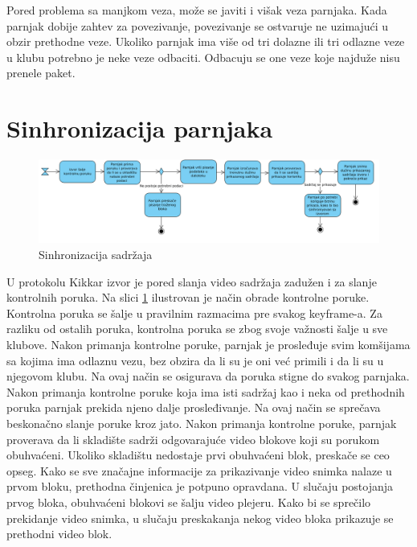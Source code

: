 \documentclass[12pt,oneside]{memoir}
\begin{document}
Pored problema sa manjkom veza, može se javiti i višak veza parnjaka. Kada parnjak dobije zahtev za povezivanje, povezivanje se ostvaruje ne uzimajući u obzir prethodne veze. Ukoliko parnjak ima više od tri dolazne ili tri odlazne veze u klubu potrebno je neke veze odbaciti. Odbacuju se one veze koje najduže nisu prenele paket. 
  

\section{Sinhronizacija parnjaka}
\label{Kikkar.5}

\begin{figure}[!ht]
  \centering
  \includegraphics[width=1.05\textwidth]{slike/sinhronizacija.jpg}
  \caption{Sinhronizacija sadržaja}
  \label{fig:sinhronizacija}
\end{figure}
\par

U protokolu Kikkar izvor je pored slanja video sadržaja zadužen i za slanje kontrolnih poruka. Na slici \ref{Kikkar.5} ilustrovan je način obrade kontrolne poruke. Kontrolna poruka se šalje u pravilnim razmacima pre svakog keyframe-a. Za razliku od ostalih poruka, kontrolna poruka se zbog svoje važnosti šalje u sve klubove. Nakon primanja kontrolne poruke, parnjak je prosleđuje svim komšijama sa kojima ima odlaznu vezu, bez obzira da li su je oni već primili i da li su u njegovom klubu. Na ovaj način se osigurava da poruka stigne do svakog parnjaka. Nakon primanja kontrolne poruke koja ima isti sadržaj kao i neka od prethodnih poruka parnjak prekida njeno dalje prosleđivanje. Na ovaj način se sprečava beskonačno slanje poruke kroz jato. Nakon primanja kontrolne poruke, parnjak proverava da li skladište sadrži odgovarajuće video blokove koji su porukom obuhvaćeni. Ukoliko skladištu nedostaje prvi obuhvaćeni blok, preskače se ceo opseg. Kako se sve značajne informacije za prikazivanje video snimka nalaze u prvom bloku, prethodna činjenica je potpuno opravdana. U slučaju postojanja prvog bloka, obuhvaćeni blokovi se šalju video plejeru. Kako bi se sprečilo prekidanje video snimka, u slučaju preskakanja nekog video bloka prikazuje se prethodni video blok.
\end{document}
